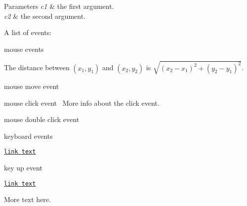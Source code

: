 \begin{DoxyParams}{Parameters}
{\em c1} & the first argument. \\
\hline
{\em c2} & the second argument.\\
\hline
\end{DoxyParams}
A list of events\+:
\begin{DoxyItemize}
\item mouse events
\begin{DoxyEnumerate}
\item The distance between $(x_1,y_1)$ and $(x_2,y_2)$ is $\sqrt{(x_2-x_1)^2+(y_2-y_1)^2}$.
\item mouse move event
\item mouse click event~\newline
 More info about the click event.
\item mouse double click event
\end{DoxyEnumerate}
\item keyboard events
\begin{DoxyEnumerate}
\item \href{./www.google.com}{\tt link text}
\item key up event
\end{DoxyEnumerate}
\begin{DoxyEnumerate}
\item \href{linkURL}{\tt link text}
\end{DoxyEnumerate}
\end{DoxyItemize}

More text here.

